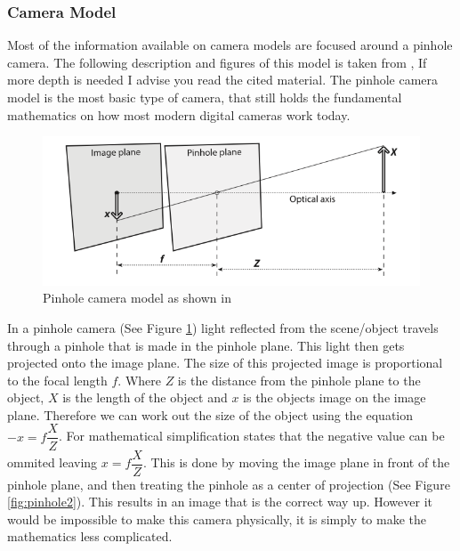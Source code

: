 \documentclass[11pt,oneside]{report}
\begin{document}
				\subsubsection{Camera Model}
				Most of the information available on camera models are focused around a pinhole camera.
				The following description and figures of this model is taken from , If more depth is needed I advise you read the cited material.
				The pinhole camera model is the most basic type of camera, that still holds the fundamental mathematics on how most modern digital cameras work today.
				\begin{figure}[!ht]
				\begin{center}
					\includegraphics[scale=0.5]{pinhole}
					\caption{Pinhole camera model as shown in \protect{} {\label{fig:pinhole}}}
				\end{center}
				\end{figure}
				In a pinhole camera (See Figure \ref{fig:pinhole}) light reflected from the scene/object travels through a pinhole that is made in the pinhole plane.
				This light then gets projected onto the image plane.
				The size of this projected image is proportional to the focal length $f$.
				Where $Z$ is the distance from the pinhole plane to the object, $X$ is the length of the object and $x$ is the objects image on the image plane.
				Therefore we can work out the size of the object using the equation $-x=f\dfrac{X}{Z}$.
				For mathematical simplification  states that the negative value can be ommited leaving $x=f\dfrac{X}{Z}$.
				This is done by moving the image plane in front of the pinhole plane, and then treating the pinhole as a center of projection (See Figure \ref{fig:pinhole2}).
				This results in an image that is the correct way up. However it would be impossible to make this camera physically, it is simply to make the mathematics less complicated.
\end{document}
